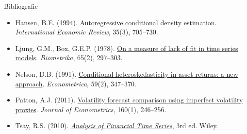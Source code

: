 \begin{frame}{Bibliografie}
\begin{itemize}
    \item Hansen, B.E. (1994). \href{https://doi.org/10.2307/2527081}{Autoregressive conditional density estimation}. \textit{International Economic Review}, 35(3), 705--730.
    \item Ljung, G.M., Box, G.E.P. (1978). \href{https://doi.org/10.1093/biomet/65.2.297}{On a measure of lack of fit in time series models}. \textit{Biometrika}, 65(2), 297--303.
    \item Nelson, D.B. (1991). \href{https://doi.org/10.2307/2938260}{Conditional heteroskedasticity in asset returns: a new approach}. \textit{Econometrica}, 59(2), 347--370.
    \item Patton, A.J. (2011). \href{https://doi.org/10.1016/j.jeconom.2010.03.034}{Volatility forecast comparison using imperfect volatility proxies}. \textit{Journal of Econometrics}, 160(1), 246--256.
    \item Tsay, R.S. (2010). \href{https://doi.org/10.1002/9780470644560}{\textit{Analysis of Financial Time Series}}, 3rd ed. Wiley.
\end{itemize}
\end{frame}


